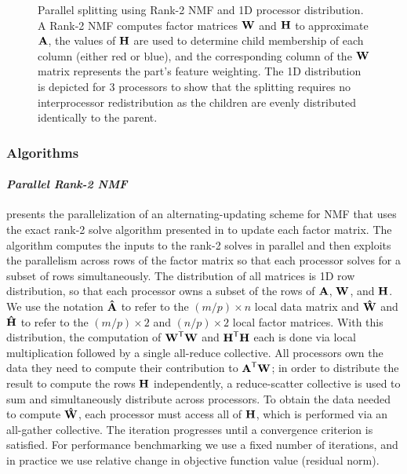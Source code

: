 \documentclass[conference,compsoc]{IEEEtran}
\begin{document}
\begin{figure}

\caption{Parallel splitting using Rank-2 NMF and 1D processor distribution.  A Rank-2 NMF computes factor matrices $\M{W}$ and $\M{H}$ to approximate $\M{A}$, the values of $\M{H}$ are used to determine child membership of each column (either red or blue), and the corresponding column of the $\M{W}$ matrix represents the part's feature weighting.  The 1D distribution is depicted for 3 processors to show that the splitting requires no interprocessor redistribution as the children are evenly distributed identically to the parent.}
\label{fig:split}
\end{figure}

\subsubsection{Algorithms}

\paragraph{\emph{Parallel Rank-2 NMF}}

 presents the parallelization of an alternating-updating scheme for NMF that uses the exact rank-2 solve algorithm presented in  to update each factor matrix.
The algorithm computes the inputs to the rank-2 solves in parallel and then exploits the parallelism across rows of the factor matrix so that each processor solves for a subset of rows simultaneously.
The distribution of all matrices is 1D row distribution, so that each processor owns a subset of the rows of $\M{A}$, $\M{W}$, and $\M{H}$.
We use the notation $\M[\hat]{A}$ to refer to the $(m/p) \times n$ local data matrix and $\M[\hat]{W}$ and $\M[\hat]{H}$ to refer to the $(m/p) \times 2$ and $(n/p)\times 2$ local factor matrices.
With this distribution, the computation of $\M{W}^\Tra\M{W}$ and $\M{H}^\Tra\M{H}$ each is done via local multiplication followed by a single all-reduce collective.
All processors own the data they need to compute their contribution to $\M{A}^\Tra \M{W}$; in order to distribute the result to compute the rows $\M{H}$ independently, a reduce-scatter collective is used to sum and simultaneously distribute across processors.
To obtain the data needed to compute $\M[\hat]{W}$, each processor must access all of $\M{H}$, which is performed via an all-gather collective.
The iteration progresses until a convergence criterion is satisfied.
For performance benchmarking we use a fixed number of iterations, and in practice we use relative change in objective function value (residual norm).
\end{document}
